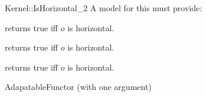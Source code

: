\begin{ccRefFunctionObjectConcept}{Kernel::IsHorizontal_2}
A model for this must provide:


{returns true iff $o$ is horizontal.}

{returns true iff $o$ is horizontal.}

{returns true iff $o$ is horizontal.}

\ccRefines
AdapatableFunctor (with one argument)

\ccSeeAlso
{} \\
 \\
 \\

\end{ccRefFunctionObjectConcept}

